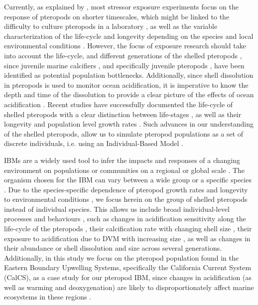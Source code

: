 Currently, as explained by \citet{Manno2017ReviewPteropodVulnerability}, most stressor exposure experiments focus on the response of pteropods on shorter timescales, which might be linked to the difficulty to culture pteropods in a laboratory \citep{Howes2014Lab}, as well as the variable characterization of the life-cycle and longevity depending on the species and local environmental conditions \citep{Bednarsek2012PteropodDistribution,Manno2017ReviewPteropodVulnerability}. However, the focus of exposure research should take into account the life-cycle, and different generations of the shelled pteropods \citep{Manno2017ReviewPteropodVulnerability}, since juvenile marine calcifiers \citep{Kroeker2013JuvenilesCalcifiers}, and specifically juvenile pteropods \citep{Bednarsek2016CumulativeEffects}, have been identified as potential population bottlenecks. Additionally, since shell dissolution in pteropods is used to monitor ocean acidification, it is imperative to know the depth and time of the dissolution to provide a clear picture of the effects of ocean acidification \citep{Johnson2016}.  Recent studies have successfully documented the life-cycle of shelled pteropods with a clear distinction between life-stages \citep{Howes2014Lab,Thabet2015Lifestages}, as well as their longevity and population level growth rates \citep{Wang2017Lifecycle}. Such advances in our understanding of the shelled pteropods, allow us to simulate pteropod populations as a set of discrete individuals, i.e. using an Individual-Based Model \citep[IBM; ][]{DeAngelis2014IBM}. 


IBMs are a widely used tool to infer the impacts and responses of a changing environment on populations or communities on a regional or global scale \citep{DeAngelis2014IBM}. The organism chosen for the IBM can vary between a wide group \citep[e.g. phytoplankton; ][]{Clark2011IBMAdaptations} or a specific species \citep[e.g. Calanus finmarchicus, three-spined stickleback; ][]{Miller1998CalanusIBM,Mintram2018IBM_Stickleback}. Due to the species-specific dependence of pteropod growth rates and longevity to environmental conditions  \citep[e.g. temperature, food availability; ][]{Wang2017Lifecycle}, we focus herein on the group of shelled pteropods instead of individual species. This allows us include broad individual-level processes and behaviours \citep{DeAngelis2014IBM}, such as changes in acidification sensitivity along the life-cycle of the pteropods \citep{Bednarsek2016CumulativeEffects}, their calcification rate with changing shell size \citep{Bednarsek2014CalcificationDissolution}, their exposure to acidification due to DVM with increasing size \citep{Maas2012DVM,Bednarsek2015VerticalDistribution}, as well as changes in their abundance or shell dissolution and size across several generations. Additionally, in this study we focus on the pteropod population found in the Eastern Boundary Upwelling Systems, specifically the California Current System (CalCS), as a case study for our pteropod IBM, since changes in acidification (as well as warming and deoxygenation) are likely to disproportionately affect marine ecosystems in these regions \citep{Gruber2011TripleWhammy,?}. 

